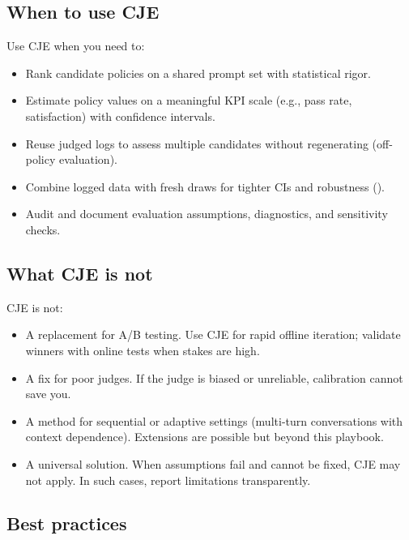 \subsection{When to use CJE}

Use CJE when you need to:
\begin{itemize}
\item Rank candidate policies on a shared prompt set with statistical rigor.
\item Estimate policy values on a meaningful KPI scale (e.g., pass rate, satisfaction) with confidence intervals.
\item Reuse judged logs to assess multiple candidates without regenerating (off-policy evaluation).
\item Combine logged data with fresh draws for tighter CIs and robustness (\dr).
\item Audit and document evaluation assumptions, diagnostics, and sensitivity checks.
\end{itemize}

\subsection{What CJE is not}

CJE is not:
\begin{itemize}
\item A replacement for A/B testing. Use CJE for rapid offline iteration; validate winners with online tests when stakes are high.
\item A fix for poor judges. If the judge is biased or unreliable, calibration cannot save you.
\item A method for sequential or adaptive settings (multi-turn conversations with context dependence). Extensions are possible but beyond this playbook.
\item A universal solution. When assumptions fail and cannot be fixed, CJE may not apply. In such cases, report limitations transparently.
\end{itemize}

\subsection{Best practices}


